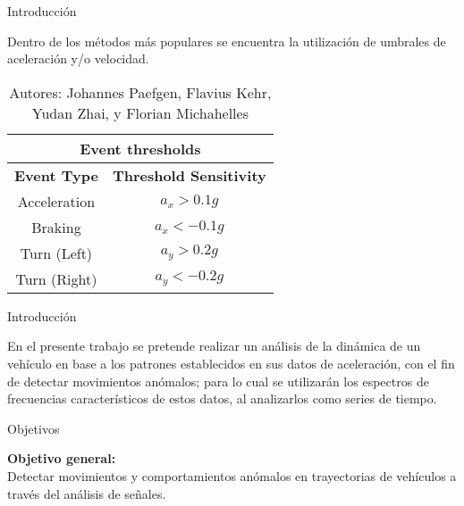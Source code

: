 \documentclass[14pt]{beamer}
\begin{document}
\begin{frame}{Introducción}

Dentro de los métodos más populares se encuentra la utilización de umbrales de aceleración y/o velocidad.

\begin{table}[H]
\centering
\begin{tabular}{|c|c|}
\multicolumn{2}{p{8cm}}{\centering \bf Event thresholds} \\ %
\hline
\bf Event Type & \bf Threshold Sensitivity \\ 
\hline
Acceleration & $a_x > 0.1g$ \\ 
\hline
Braking & $a_x < -0.1g$ \\ 
\hline
Turn (Left) & $a_y > 0.2g$ \\
\hline
Turn (Right) & $a_y < -0.2g$ \\ 
\hline
\end{tabular}
\renewcommand{\tablename}{Tabla} 
\caption{\justifying Autores: Johannes Paefgen, Flavius Kehr, Yudan Zhai, y Florian Michahelles}
\end{table}

\end{frame}



\begin{frame}{Introducción}

En el presente trabajo se pretende realizar un análisis de la dinámica de un vehículo en base a los patrones establecidos en sus datos de aceleración, con el fin de detectar movimientos anómalos; para lo cual se utilizarán los espectros de frecuencias característicos de estos datos, al analizarlos como series de tiempo.

\end{frame}



\begin{frame}{Objetivos} 

{\bf Objetivo general:\\}
\vskip 10pt
Detectar movimientos y comportamientos anómalos en trayectorias de vehículos a través del análisis de señales.\\

\end{frame}
\end{document}
